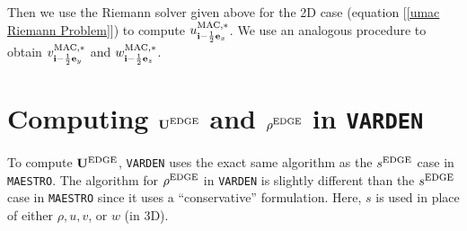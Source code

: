 Then we use the Riemann solver given above for the 2D case (equation
[\ref{umac Riemann Problem}]) to compute
$u_{{\bf i}-\frac{1}{2}{\bf e}_x}^{\rm MAC,*}$.  We use an analogous procedure to
obtain $v_{{\bf i}-\frac{1}{2}{\bf e}_y}^{\rm MAC,*}$ and
$w_{{\bf i}-\frac{1}{2}{\bf e}_z}^{\rm MAC,*}$.

\newpage

\section{Computing ${\bf U}^{\rm EDGE}$ and $\rho^{\rm EDGE}$ in {\tt VARDEN}}
To compute ${\bf U}^{\rm EDGE}$, {\tt VARDEN} uses the exact same algorithm
as the $s^{\rm EDGE}$ case in {\tt MAESTRO}.  The algorithm for
$\rho^{\rm EDGE}$ in {\tt VARDEN} is slightly different than the
$s^{\rm EDGE}$ case in {\tt MAESTRO} since it uses a ``conservative''
formulation.  Here, $s$ is used in place of either $\rho, u, v$, or
$w$ (in 3D).

